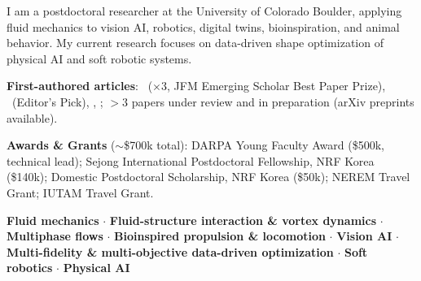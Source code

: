 
\begin{cvparagraph}
I am a postdoctoral researcher at the University of Colorado Boulder,
applying fluid mechanics to vision AI, robotics, digital twins, bioinspiration,
and animal behavior.
My current research focuses on data-driven shape optimization of physical AI and soft robotic systems.
\end{cvparagraph}

\vspace{2.5mm}
\begin{cvitems}
  \item \textbf{First-authored articles}: \jfm~($\times$3, JFM Emerging Scholar Best Paper Prize), \pof~(Editor's Pick), \srep, \icb;
        $>$3 papers under review and in preparation (arXiv preprints available).
  \item \textbf{Awards \& Grants} ($\sim$\$700k total):
        DARPA Young Faculty Award (\$500k, technical lead);
        Sejong International Postdoctoral Fellowship, NRF Korea (\$140k);
        Domestic Postdoctoral Scholarship, NRF Korea (\$50k);
        NEREM Travel Grant;
        IUTAM Travel Grant.
\end{cvitems}

\vspace{2.5mm}
\begin{cvitems}
  \item \textbf{Fluid mechanics} $\cdot$
        \textbf{Fluid-structure interaction \& vortex dynamics} $\cdot$
        \textbf{Multiphase flows} $\cdot$
        \textbf{Bioinspired propulsion \& locomotion} $\cdot$
        \textbf{Vision AI} $\cdot$
        \textbf{Multi-fidelity \& multi-objective data-driven optimization} $\cdot$
        \textbf{Soft robotics} $\cdot$
        \textbf{Physical AI}
\end{cvitems}

